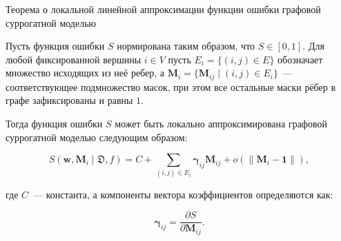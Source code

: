 \documentclass{beamer}
\begin{document}
\begin{frame}{Теорема о локальной линейной аппроксимации функции ошибки графовой суррогатной моделью}
    \small
    \begin{theorem}[Ivanov, 2026]
    Пусть функция ошибки $S$ нормирована таким образом, что $S \in [0, 1]$. Для любой фиксированной вершины $i \in V$ пусть $E_i = \{(i,j) \in E\}$ обозначает множество исходящих из неё ребер, а $\mathbf{M}_i = \{\mathbf{M}_{ij} \mid (i,j) \in E_i\}$~--- соответствующее подмножество масок, при этом все остальные маски рёбер в графе зафиксированы и равны $1$.

    Тогда функция ошибки $S$ может быть локально аппроксимирована графовой суррогатной моделью следующим образом:
    
    $$S(\mathbf{w}, \mathbf{M}_i \mid \mathfrak{D}, f) = C + \sum_{(i,j) \in E_i} \boldsymbol{\gamma}_{ij} \mathbf{M}_{ij} + o(\|\mathbf{M}_i - \mathbf{1}\|),$$
    
    где $C$~--- константа, а компоненты вектора коэффициентов определяются как:
    
    $$\boldsymbol{\gamma}_{ij} = \frac{\partial S}{\partial \mathbf{M}_{ij}}.$$
    \end{theorem}
\end{frame}
\end{document}
